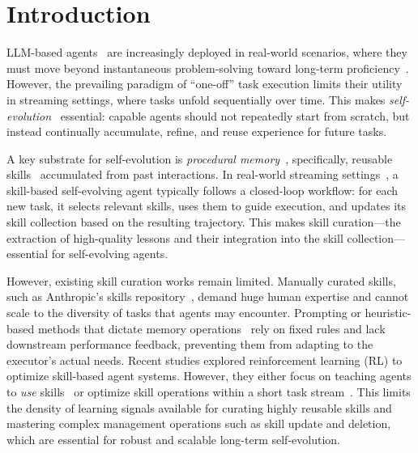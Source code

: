 \section{Introduction}

LLM-based agents~\citep{DBLP:journals/fcsc/WangMFZYZCTCLZWW24} are increasingly deployed in real-world scenarios, where they must move beyond instantaneous problem-solving toward long-term proficiency~\citep{he2026memoryarena}. However, the prevailing paradigm of ``one-off'' task execution limits their utility in streaming settings, where tasks unfold sequentially over time. This makes \emph{self-evolution}~\citep{fang2025comprehensive, gao2025survey} essential: capable agents should not repeatedly start from scratch, but instead continually accumulate, refine, and reuse experience for future tasks.

A key substrate for self-evolution is \emph{procedural memory}~\citep{hu2025memory, wu2025human, DBLP:journals/corr/abs-2508-06433}, specifically, reusable skills~\citep{anthropic_skills_2025, wang2025inducing} accumulated from past interactions. In real-world streaming settings~\citep{wu2024streambench}, a skill-based self-evolving agent typically follows a closed-loop workflow: for each new task, it selects relevant skills, uses them to guide execution, and updates its skill collection based on the resulting trajectory. This makes skill curation---the extraction of high-quality lessons and their integration into the skill collection---essential for self-evolving agents.

However, existing skill curation works remain limited. Manually curated skills, such as Anthropic's skills repository~\citep{anthropic_skills_2025}, demand huge human expertise and cannot scale to the diversity of tasks that agents may encounter. Prompting or heuristic-based methods that dictate memory operations~\citep{xu2025amem, qiu2025alita, DBLP:journals/corr/abs-2504-07079} rely on fixed rules and lack downstream performance feedback, preventing them from adapting to the executor's actual needs. Recent studies explored reinforcement learning (RL) to optimize skill-based agent systems. However, they either focus on teaching agents to \textit{use} skills~\citep{xia2026skillrl, tu2026dynamic} or
optimize skill operations within a short task stream~\citep{DBLP:journals/corr/abs-2512-17102, DBLP:journals/corr/abs-2602-10652}. This limits the density of learning signals available for curating highly reusable skills and mastering complex management operations such as skill update and deletion, which are essential for robust and scalable long-term self-evolution.

